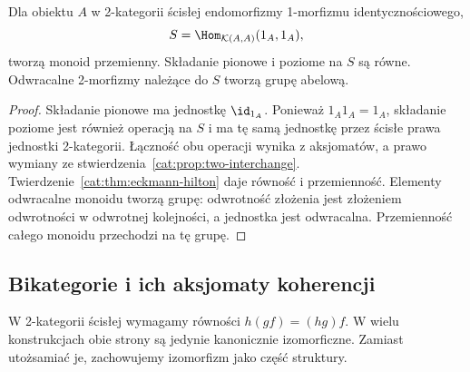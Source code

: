 \begin{wniosek}\label{cat:cor:two-unit-endomorphism}
Dla obiektu $A$ w 2-kategorii ścisłej endomorfizmy 1-morfizmu identycznościowego,
\[
 S=\Hom_{\mathcal K(A,A)}(1_A,1_A),
\]
tworzą monoid przemienny. Składanie pionowe i poziome na $S$ są równe. Odwracalne 2-morfizmy należące do $S$ tworzą grupę abelową.
\end{wniosek}
\begin{proof}
Składanie pionowe ma jednostkę $\id_{1_A}$. Ponieważ $1_A1_A=1_A$, składanie poziome jest również operacją na $S$ i ma tę samą jednostkę przez ścisłe prawa jednostki 2-kategorii. Łączność obu operacji wynika z aksjomatów, a prawo wymiany ze stwierdzenia~\ref{cat:prop:two-interchange}. Twierdzenie~\ref{cat:thm:eckmann-hilton} daje równość i przemienność. Elementy odwracalne monoidu tworzą grupę: odwrotność złożenia jest złożeniem odwrotności w odwrotnej kolejności, a jednostka jest odwracalna. Przemienność całego monoidu przechodzi na tę grupę.
\end{proof}


\subsection{Bikategorie i ich aksjomaty koherencji}

W 2-kategorii ścisłej wymagamy równości $h(gf)=(hg)f$. W wielu konstrukcjach obie strony są jedynie kanonicznie izomorficzne. Zamiast utożsamiać je, zachowujemy izomorfizm jako część struktury.

